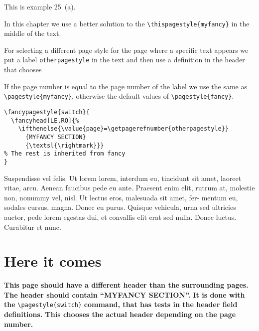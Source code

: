 \documentclass[openany]{book}
\begin{document}
\begin{boxedminipage}{\textwidth}
This is example 25~(a).

In this chapter we use a better solution to the \verb|\thispagestyle{myfancy}| in the middle of the text.

For selecting a different page style for the page where a specific text appears we put a label \texttt{otherpagestyle} in the text and then use a definition in the header that chooses

 If the page number is equal to the page number of the label we use the same as \verb|\pagestyle{myfancy}|, otherwise the default values of \verb|\pagestyle{fancy}|.

\begin{verbatim}
\fancypagestyle{switch}{
  \fancyhead[LE,RO]{%
    \ifthenelse{\value{page}=\getpagerefnumber{otherpagestyle}}
      {MYFANCY SECTION}
      {\textsl{\rightmark}}}
% The rest is inherited from fancy
}
\end{verbatim}
\end{boxedminipage}

\bigskip

\lipsum[6-8]

\bigskip
Suspendisse vel felis. Ut lorem lorem, interdum eu, tincidunt sit amet, laoreet vitae, arcu. Aenean faucibus pede eu ante. Praesent enim elit, rutrum at, molestie non, nonummy vel, nisl. Ut lectus eros, malesuada sit amet, fer- mentum eu, sodales cursus, magna. Donec eu purus. Quisque vehicula, urna sed ultricies auctor, pede lorem egestas dui, et convallis elit erat sed nulla. Donec luctus. Curabitur et nunc. 

\section{Here it comes}

\noindent
\begin{boxedminipage}{\textwidth}
\begin{minipage}{\linewidth}
  \textbf{This page should have a different header than the surrounding
    pages. The header should contain \textnormal{``MYFANCY SECTION''}.
    \label{otherpagestyle}
    It is done with the} \verb|\pagestyle{switch}| \textbf{command, that
    has tests in the header field definitions. This chooses the actual
    header depending on the page number.}
\end{minipage}
\end{boxedminipage}
\bigskip
\end{document}
